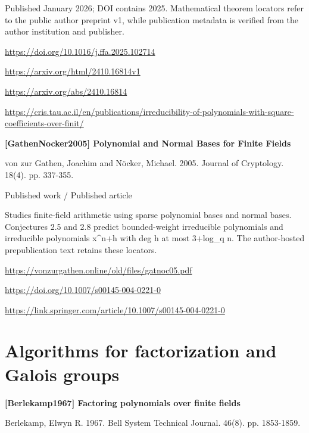 \documentclass[11pt,a4paper,oneside,openany]{book}
\begin{document}
{\small Published January 2026; DOI contains 2025. Mathematical theorem locators refer to the public author preprint v1, while publication metadata is verified from the author institution and publisher.}\par
{\footnotesize\url{https://doi.org/10.1016/j.ffa.2025.102714}}\par
{\footnotesize\url{https://arxiv.org/html/2410.16814v1}}\par
{\footnotesize\url{https://arxiv.org/abs/2410.16814}}\par
{\footnotesize\url{https://cris.tau.ac.il/en/publications/irreducibility-of-polynomials-with-square-coefficients-over-finit/}}\par
\vspace{9pt}
\hypertarget{ref:GathenNocker2005}{}
{\sffamily\bfseries\color{atlasgreen}[GathenNocker2005] Polynomial and Normal Bases for Finite Fields}\par
\color{black} von zur Gathen, Joachim and Nöcker, Michael. 2005. Journal of Cryptology. 18(4). pp. 337-355.\par
{\small\sffamily\color{atlasgold}Published work / Published article}\par
\color{black} Studies finite-field arithmetic using sparse polynomial bases and normal bases. Conjectures 2.5 and 2.8 predict bounded-weight irreducible polynomials and irreducible polynomials x\textasciicircum{}n+h with deg h at most 3+log\_\allowbreak{}q n. The author-hosted prepublication text retains these locators.\par
{\footnotesize\url{https://vonzurgathen.online/old/files/gatnoc05.pdf}}\par
{\footnotesize\url{https://doi.org/10.1007/s00145-004-0221-0}}\par
{\footnotesize\url{https://link.springer.com/article/10.1007/s00145-004-0221-0}}\par
\vspace{9pt}
\section{Algorithms for factorization and Galois groups}
\hypertarget{ref:Berlekamp1967}{}
{\sffamily\bfseries\color{atlasgreen}[Berlekamp1967] Factoring polynomials over finite fields}\par
\color{black} Berlekamp, Elwyn R. 1967. Bell System Technical Journal. 46(8). pp. 1853-1859.\par
\end{document}
